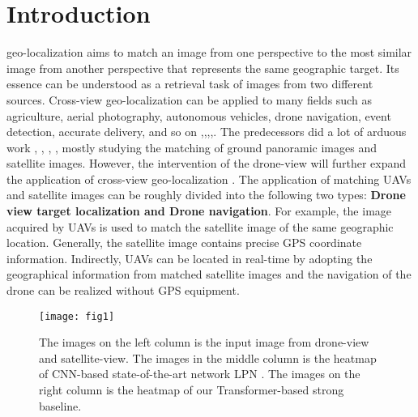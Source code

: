 \documentclass[lettersize,journal]{IEEEtran}
\begin{document}
\section{Introduction}
 geo-localization aims to match an image from one perspective to the most similar image from another perspective that represents the same geographic target. Its essence can be understood as a retrieval task of images from two different sources. Cross-view geo-localization can be applied to many fields such as agriculture, aerial photography, autonomous vehicles, drone navigation, event detection, accurate delivery, and so on \cite{ref1},\cite{ref2},\cite{ref3},\cite{ref4},\cite{ref5}. The predecessors did a lot of arduous work \cite{ref6}, \cite{ref7}, \cite{ref8}, \cite{ref9}, mostly studying the matching of ground panoramic images and satellite images. However, the intervention of the drone-view will further expand the application of cross-view geo-localization \cite{ref10} \cite{ref51}. The application of matching UAVs and satellite images can be roughly divided into the following two types: \textbf{Drone view target localization and Drone navigation}. For example, the image acquired by UAVs is used to match the satellite image of the same geographic location. Generally, the satellite image contains precise GPS coordinate information. Indirectly, UAVs can be located in real-time by adopting the geographical information from matched satellite images and the navigation of the drone can be realized without GPS equipment.

\begin{figure}[!t]
\centering
\texttt{[image: fig1]}
\caption{The images on the left column is the input image from drone-view and satellite-view. The images in the middle column is the heatmap of CNN-based state-of-the-art network LPN \cite{ref11}. The images on the right column is the heatmap of our Transformer-based strong baseline.}
\label{fig_1}
\end{figure}
\end{document}
